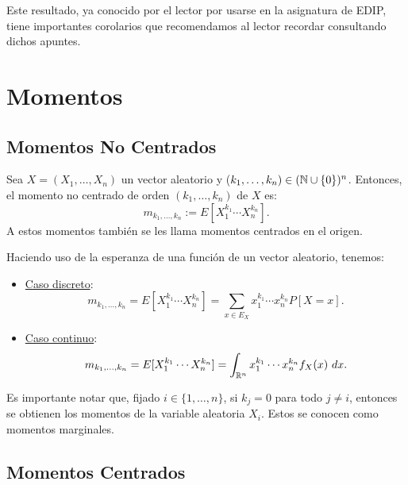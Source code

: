 Este resultado, ya conocido por el lector por usarse en la asignatura de EDIP, tiene importantes corolarios que recomendamos al lector recordar consultando dichos apuntes.

\section{Momentos}

\subsection{Momentos No Centrados}

\begin{definicion}
    Sea $X=(X_1,\dots,X_n)$ un vector aleatorio y ($k_1,\dots,k_n)\in (\mathbb{N}\cup \{0\})^n$. Entonces, el momento no centrado de orden $(k_1,\dots,k_n)$ de $X$ es:
    \begin{equation*}
        m_{k_1,\dots,k_n} := E[X_1^{k_1}\cdots X_n^{k_n}].
    \end{equation*}
    A estos momentos también se les llama momentos centrados en el origen.
\end{definicion}

Haciendo uso de la esperanza de una función de un vector aleatorio, tenemos:
\begin{itemize}
    \item \ul{Caso discreto}:
    \begin{equation*}
        m_{k_1,\dots,k_n}=E[X_1^{k_1}\cdots X_n^{k_n}] = \sum_{x\in E_X} x_1^{k_1}\cdots x_n^{k_n} P[X=x].
    \end{equation*}

    \item \ul{Caso continuo}:
    \begin{equation*}
        m_{k_1,\dots,k_n}=E[X_1^{k_1}\cdots X_n^{k_n}] = \int_{\mathbb{R}^n} x_1^{k_1}\cdots x_n^{k_n} f_X(x)~d x.
    \end{equation*}
\end{itemize}

Es importante notar que, fijado $i\in \{1,\dots,n\}$, si $k_j=0$ para todo $j\neq i$, entonces se obtienen los momentos de la variable aleatoria $X_i$. Estos se conocen como momentos marginales.

\subsection{Momentos Centrados}

